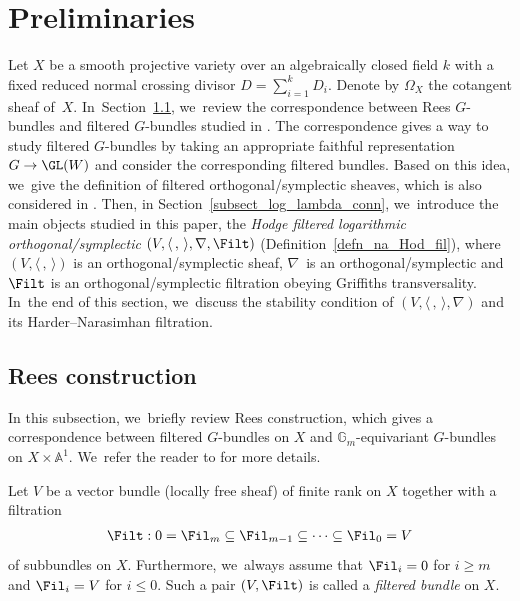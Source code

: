 \section{Preliminaries}\label{sect_pre}

Let $X$ be a smooth projective variety over an algebraically closed field $k$ with a fixed reduced normal crossing divisor $D=\sum_{i=1}^{k}D_i$. Denote by $\Omega_X$ the cotangent sheaf of~$X$. In~Section~\ref{subsect_rees}, we~review the correspondence between Rees $G$-bundles and filtered $G$-bundles studied in \cite{Lo17a,Lo17b}. The correspondence gives a way to study filtered $G$-bundles by taking an appropriate faithful representation $G \to \GL(W)$ and consider the corresponding filtered bundles. Based on this idea, we~give the definition of filtered orthogonal/symplectic sheaves, which is also considered in \hbox{\cite[\S5]{GS03}}. Then, in Section~\ref{subsect_log_lambda_conn}, we~introduce the main objects studied in this paper, the \emph{Hodge filtered logarithmic orthogonal/symplectic \lconnections} $(V, \langle \,, \, \rangle, \nabla, \Filt)$ (Definition~\ref{defn_na_Hod_fil}), where $(V, \langle \,, \, \rangle)$ is an orthogonal/symplectic sheaf, $\nabla$~is an orthogonal/symplectic \lconnection and $\Filt$ is an orthogonal/symplectic filtration obeying Griffiths transversality. In~the end of this section, we~discuss the stability condition of $(V, \langle \,, \, \rangle, \nabla)$ and its Harder--Narasimhan filtration.

\subsection{Rees construction}\label{subsect_rees}
In this subsection, we~briefly review Rees construction, which gives a correspondence between filtered $G$-bundles on $X$ and $\mathbb{G}_m$-equivariant $G$-bundles on $X \times \mathbb{A}^1$. We~refer the reader to \cite{L13,Lo17a,Lo17b} for more details.

Let $V$ be a vector bundle (locally free sheaf) of finite rank on $X$ together with a filtration
\begin{align*}
\Filt: 0 = \Fil_m \subseteq \Fil_{m-1} \subseteq \dots \subseteq \Fil_0 = V
\end{align*}
of subbundles on $X$. Furthermore, we~always assume that $\Fil_i =0$ for $i \geq m$ and $\Fil_i = V$ for $i \leq 0$. Such a pair $(V,\Filt)$ is called a \emph{filtered bundle} on $X$.

